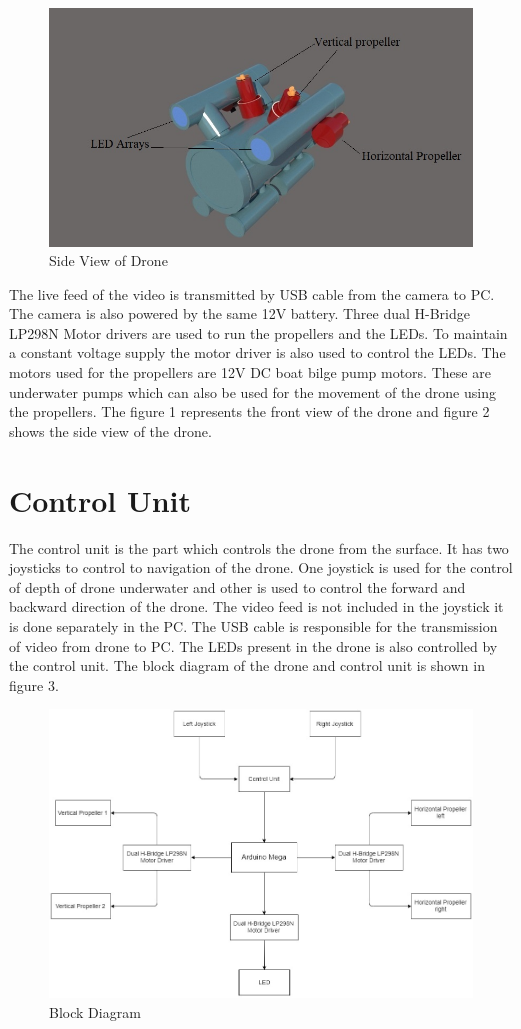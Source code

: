 \begin{figure}[ht]
	\centering
	\includegraphics[width=\linewidth]{images/SideTop.jpg}
	\caption{Side View of Drone}
	\label{diag:sample}
\end{figure}

The live feed of the video is transmitted by USB cable from the camera to PC. The camera is also powered by the same 12V battery. Three dual H-Bridge LP298N Motor drivers are used to run the propellers and the LEDs. To maintain a constant voltage supply the motor driver is also used to control the LEDs. The motors used for the propellers are 12V DC boat bilge pump motors. These are underwater pumps which can also be used for the movement of the drone using the propellers. The figure 1 represents the front view of the drone and figure 2 shows the side view of the drone.

\section{Control Unit}
The control unit is the part which controls the drone from the surface. It has two joysticks to control to navigation of the drone. One joystick is used for the control of depth of drone underwater and other is used to control the forward and backward direction of the drone. The video feed is not included in the joystick it is done separately in the PC. The USB cable is responsible for the transmission of video from drone to PC. The LEDs present in the drone is also controlled by the control unit. 
The block diagram of the drone and control unit is shown in figure 3.

\begin{figure}[ht]
	\centering
	\includegraphics[width=\linewidth]{images/BlockDiagram.jpg}
	\caption{Block Diagram}
	\label{diag:sample}
\end{figure}